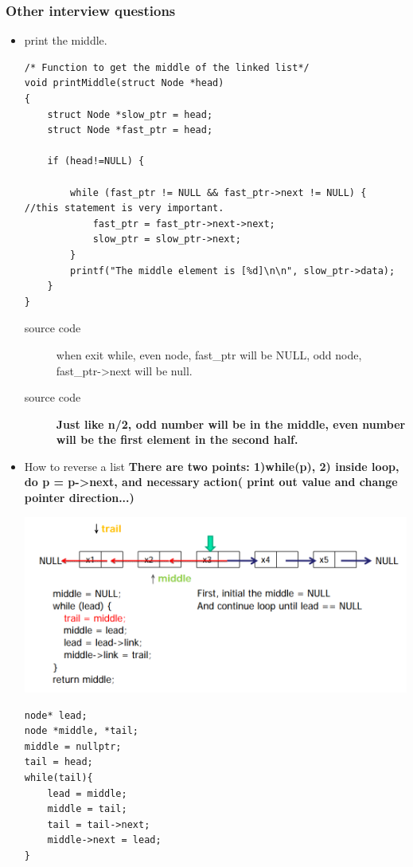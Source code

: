 \documentclass[a4paper,11pt,twoside]{book}
\begin{document}
\subsubsection{Other interview questions}
\begin{itemize}
	\item print the middle. 
\begin{lstlisting}[breaklines]
/* Function to get the middle of the linked list*/
void printMiddle(struct Node *head) 
{ 
	struct Node *slow_ptr = head; 
	struct Node *fast_ptr = head; 
	
	if (head!=NULL) {
		 
		while (fast_ptr != NULL && fast_ptr->next != NULL) {  //this statement is very important.
			fast_ptr = fast_ptr->next->next; 
			slow_ptr = slow_ptr->next; 
		} 
		printf("The middle element is [%d]\n\n", slow_ptr->data); 
	} 
} 
\end{lstlisting}
\begin{description}
	\item[source code] when exit while, even node, fast\_ptr will be NULL, odd node, fast\_ptr->next will be null.
	\item[source code] \textbf{Just like n/2, odd number will be in the middle, even number will be the first element in the second half.}
\end{description}
	
	\item How to reverse a list \textbf{ There are two points: 1)while(p),  2) inside loop, do p = p->next, and necessary action( print out value and change pointer direction...)}
\newline

\includegraphics[scale=0.65]{pics/reverse.png} \newline

\begin{lstlisting}[breaklines]
node* lead; 
node *middle, *tail;
middle = nullptr;
tail = head;
while(tail){
	lead = middle;
	middle = tail;
	tail = tail->next;
	middle->next = lead;
}


\end{lstlisting}
\end{itemize}
\end{document}
